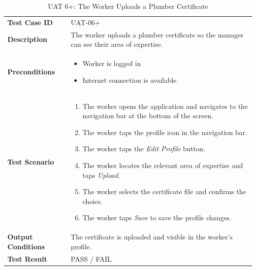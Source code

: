 \documentclass[12pt,a4paper]{article}
\begin{document}
\begin{table}[h]
\centering
\caption{UAT 6+: The Worker Uploads a Plumber Certificate}
\begin{tabularx}{\textwidth}{>{\bfseries}l X}
\toprule
Test Case ID & UAT-06+ \\
Description & The worker uploads a plumber certificate so the manager can see their area of expertise. \\
Preconditions &
\begin{itemize}[noitemsep]
    \item Worker is logged in
    \item Internet connection is available
\end{itemize} \\
Test Scenario &
\begin{enumerate}[noitemsep]
    \item The worker opens the application and navigates to the navigation bar at the bottom of the screen.
    \item The worker taps the profile icon in the navigation bar.
    \item The worker taps the \emph{Edit Profile} button.
    \item The worker locates the relevant area of expertise and taps \emph{Upload}.
    \item The worker selects the certificate file and confirms the choice.
    \item The worker taps \emph{Save} to save the profile changes.
\end{enumerate} \\
Output Conditions & The certificate is uploaded and visible in the worker's profile. \\
Test Result & PASS / FAIL \\
\bottomrule
\end{tabularx}
\end{table}
\end{document}
